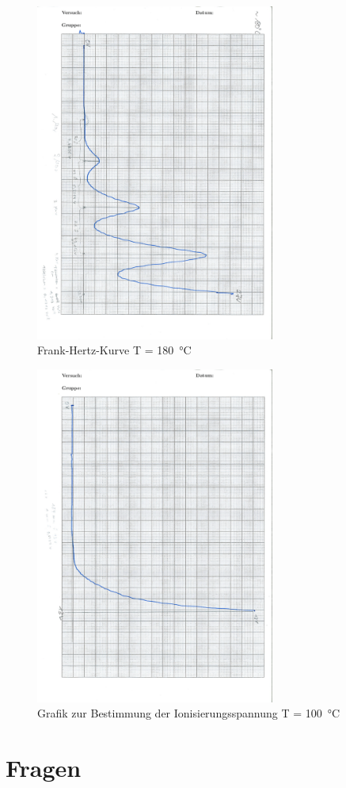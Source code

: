 \documentclass[a4,10pt]{article}
\newcommand{\V}{V601}
\begin{document}
\begin{figure}[h!]
	\centering
	\includegraphics[angle=90,origin=c, width=0.7\textwidth]{scan/Messung3.pdf}
	\caption{Frank-Hertz-Kurve T = \SI{180}{\celsius}}
	\label{fig:messung3}
\end{figure}
\begin{figure}[h!]
	\centering
	\includegraphics[angle=90,origin=c, width=0.7\textwidth]{scan/Messung4.pdf}
	\caption{Grafik zur Bestimmung der Ionisierungsspannung T = \SI{100}{\celsius}}
	\label{fig:messung4}
\end{figure}
\clearpage

\section{Fragen}


\clearpage
\listoftodos
\listoffigures
\listoftables
\clearpage
\printbibliography[title = Literaturverzeichnis]
\end{document}
